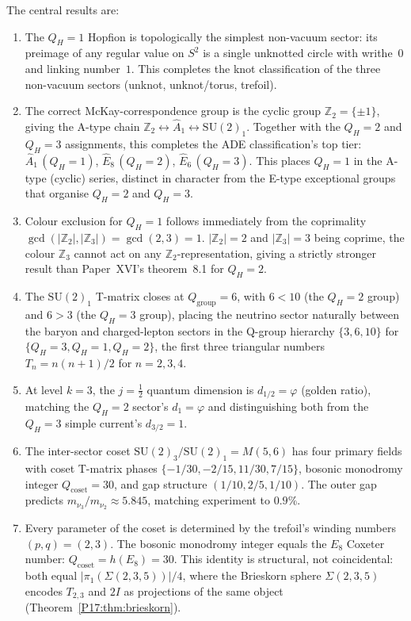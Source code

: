 \documentclass[11pt,a4paper]{article}
\theoremstyle{definition}\newtheorem{definition}[theorem]{Definition}
\theoremstyle{remark}
\newcommand{\vp}{\varphi}
\newcommand{\SU}{\mathrm{SU}}
\newcommand{\twoI}{2I}
\newcommand{\QH}{Q_H}
\newcommand{\Ztwo}{\mathbb{Z}_2}
\newcommand{\Zthree}{\mathbb{Z}_3}
\newcommand{\dimq}[1]{d_{#1}}
\begin{document}
The central results are:
\begin{enumerate}[label=(\roman*)]
\item The $\QH=1$ Hopfion is topologically the simplest non-vacuum
  sector: its preimage of any regular value on $S^2$ is a single
  unknotted circle with writhe~$0$ and linking number~$1$.  This
  completes the knot classification of the three non-vacuum sectors
  (unknot, unknot/torus, trefoil).
\item The correct McKay-correspondence group is the cyclic group
  $\Ztwo=\{{\pm1}\}$, giving the A-type chain
  $\Ztwo\leftrightarrow\widehat{A}_1\leftrightarrow\SU(2)_1$.  Together
  with the $\QH=2$ and $\QH=3$ assignments, this completes the ADE
  classification's top tier:
  $\widehat{A}_1\,(\QH=1)$,
  $\widehat{E}_8\,(\QH=2)$,
  $\widehat{E}_6\,(\QH=3)$.
  This places $\QH=1$ in the A-type (cyclic) series, distinct in
  character from the E-type exceptional groups that organise $\QH=2$
  and $\QH=3$.
\item Colour exclusion for $\QH=1$ follows immediately from the
  coprimality $\gcd(|\Ztwo|,|\Zthree|)=\gcd(2,3)=1$.
  $|\Ztwo|=2$ and $|\Zthree|=3$ being coprime, the colour $\Zthree$
  cannot act on any $\Ztwo$-representation, giving a strictly stronger
  result than Paper~XVI's theorem~8.1 %
  for $\QH=2$.
\item The $\SU(2)_1$ T-matrix closes at $Q_{\mathrm{group}}=6$, with
  $6<10$ (the $\QH=2$ group) and $6>3$ (the $\QH=3$ group), placing
  the neutrino sector naturally between the baryon and charged-lepton
  sectors in the Q-group hierarchy $\{3,6,10\}$ for
  $\{\QH=3,\QH=1,\QH=2\}$, the first three triangular numbers
  $T_n=n(n+1)/2$ for $n=2,3,4$.
\item At level $k=3$, the $j=\tfrac12$ quantum dimension is
  $\dimq{1/2}=\vp$ (golden ratio), matching the $\QH=2$ sector's
  $\dimq{1}=\vp$ and distinguishing both from the $\QH=3$ simple
  current's $\dimq{3/2}=1$.
\item The inter-sector coset $\SU(2)_3/\SU(2)_1=M(5,6)$ has four
  primary fields with coset T-matrix phases
  $\{-1/30,-2/15,11/30,7/15\}$, bosonic monodromy integer
  $Q_{\mathrm{coset}}=30$, and gap structure $(1/10,2/5,1/10)$.  The
  outer gap predicts $m_{\nu_3}/m_{\nu_2}\approx5.845$, matching
  experiment to $0.9\%$.
\item Every parameter of the coset is determined by the trefoil's
  winding numbers $(p,q)=(2,3)$.  The bosonic monodromy integer equals
  the $E_8$ Coxeter number: $Q_{\mathrm{coset}}=h(E_8)=30$.  This
  identity is structural, not coincidental: both equal
  $|\pi_1(\Sigma(2,3,5))|/4$, where the Brieskorn sphere
  $\Sigma(2,3,5)$ encodes $T_{2,3}$ and $\twoI$ as projections of
  the same object (Theorem~\ref{P17:thm:brieskorn}).
\end{enumerate}
\end{document}
